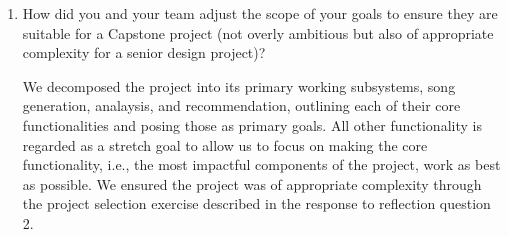 \documentclass{article}
\begin{document}
\begin{enumerate}
    \item How did you and your team adjust the scope of your goals to ensure
    they are suitable for a Capstone project (not overly ambitious but also of
    appropriate complexity for a senior design project)?

    We decomposed the project into its primary working subsystems, song generation, analaysis, and recommendation, outlining each of their core functionalities and posing those as primary goals. All other functionality is regarded as a stretch goal to allow us to focus on making the core functionality, i.e., the most impactful components of the project, work as best as possible. We ensured the project was of appropriate complexity through the project selection exercise described in the response to reflection question 2.
\end{enumerate}  
\end{document}
